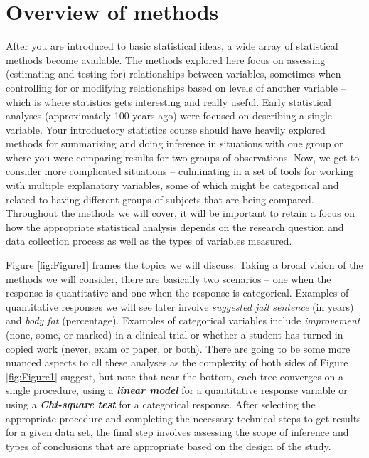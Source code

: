 \documentclass[]{book}
\begin{document}
\section{Overview of methods}\label{overview-of-methods}

After you are introduced to basic statistical ideas, a wide array of
statistical methods become available. The methods explored here focus on
assessing (estimating and testing for) relationships between variables,
sometimes when controlling for or modifying relationships based on
levels of another variable -- which is where statistics gets interesting
and really useful. Early statistical analyses (approximately 100 years
ago) were focused on describing a single variable. Your introductory
statistics course should have heavily explored methods for summarizing
and doing inference in situations with one group or where you were
comparing results for two groups of observations. Now, we get to
consider more complicated situations -- culminating in a set of tools
for working with multiple explanatory variables, some of which might be
categorical and related to having different groups of subjects that are
being compared. Throughout the methods we will cover, it will be
important to retain a focus on how the appropriate statistical analysis
depends on the research question and data collection process as well as
the types of variables measured.

Figure \ref{fig:Figure1} frames the topics we will discuss. Taking a
broad vision of the methods we will consider, there are basically two
scenarios -- one when the response is quantitative and one when the
response is categorical. Examples of quantitative responses we will see
later involve \emph{suggested jail sentence} (in years) and \emph{body
fat} (percentage). Examples of categorical variables include
\emph{improvement} (none, some, or marked) in a clinical trial or
whether a student has turned in copied work (never, exam or paper, or
both). There are going to be some more nuanced aspects to all these
analyses as the complexity of both sides of Figure \ref{fig:Figure1}
suggest, but note that near the bottom, each tree converges on a single
procedure, using a \textbf{\emph{linear model}} for a quantitative
response variable or using a \textbf{\emph{Chi-square test}} for a
categorical response. After selecting the appropriate procedure and
completing the necessary technical steps to get results for a given data
set, the final step involves assessing the scope of inference and types
of conclusions that are appropriate based on the design of the study.
\end{document}
